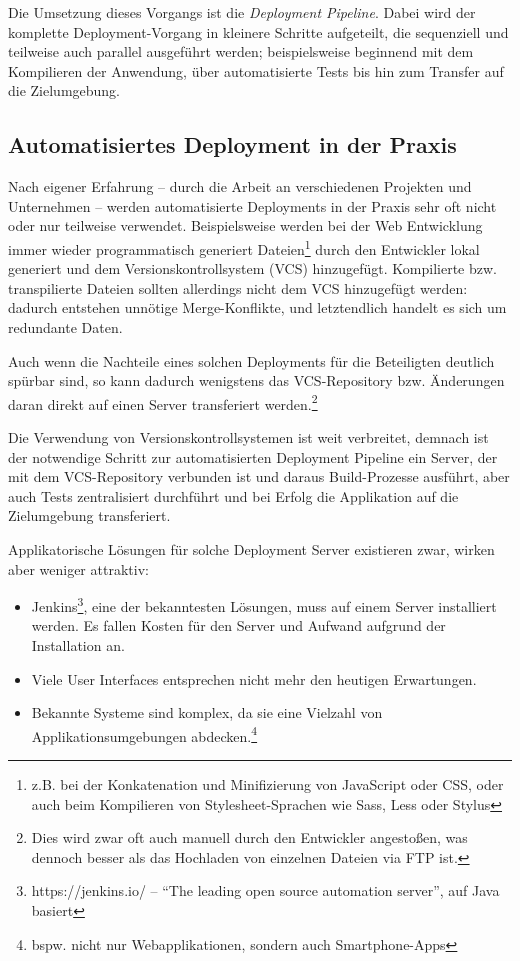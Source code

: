 \documentclass{scrartcl}
\begin{document}
Die Umsetzung dieses Vorgangs ist die \emph{Deployment Pipeline}. Dabei wird der komplette Deployment-Vorgang in kleinere Schritte aufgeteilt, die sequenziell und teilweise auch parallel ausgeführt werden; beispielsweise beginnend mit dem Kompilieren der Anwendung, über automatisierte Tests bis hin zum Transfer auf die Zielumgebung. \citep{FowlerDP}

\subsection{Automatisiertes Deployment in der Praxis}
\label{sec:deployment-real}

Nach eigener Erfahrung – durch die Arbeit an verschiedenen Projekten und Unternehmen – werden automatisierte Deployments in der Praxis sehr oft nicht oder nur teilweise verwendet. Beispielsweise werden bei der Web Entwicklung immer wieder programmatisch generiert Dateien\footnote{z.B. bei der Konkatenation und Minifizierung von JavaScript oder CSS, oder auch beim Kompilieren von Stylesheet-Sprachen wie Sass, Less oder Stylus} durch den Entwickler lokal generiert und dem Versionskontrollsystem (VCS) hinzugefügt. Kompilierte bzw. transpilierte Dateien sollten allerdings nicht dem VCS hinzugefügt werden: dadurch entstehen unnötige Merge-Konflikte, und letztendlich handelt es sich um redundante Daten.

Auch wenn die Nachteile eines solchen Deployments für die Beteiligten deutlich spürbar sind, so kann dadurch wenigstens das VCS-Repository bzw. Änderungen daran direkt auf einen Server transferiert werden.\footnote{Dies wird zwar oft auch manuell durch den Entwickler angestoßen, was dennoch besser als das Hochladen von einzelnen Dateien via FTP ist.}

Die Verwendung von Versionskontrollsystemen ist weit verbreitet, demnach ist der notwendige Schritt zur automatisierten Deployment Pipeline ein Server, der mit dem VCS-Repository verbunden ist und daraus Build-Prozesse ausführt, aber auch Tests zentralisiert durchführt und bei Erfolg die Applikation auf die Zielumgebung transferiert.

Applikatorische Lösungen für solche Deployment Server existieren zwar, wirken aber weniger attraktiv:

\begin{itemize}
  \item Jenkins\footnote{https://jenkins.io/ – ``The leading open source automation server'', auf Java basiert}, eine der bekanntesten Lösungen, muss auf einem Server installiert werden. Es fallen Kosten für den Server und Aufwand aufgrund der Installation an.
  \item Viele User Interfaces entsprechen nicht mehr den heutigen Erwartungen.
  \item Bekannte Systeme sind komplex, da sie eine Vielzahl von Applikationsumgebungen abdecken.\footnote{bspw. nicht nur Webapplikationen, sondern auch Smartphone-Apps}
\end{itemize}
\end{document}
